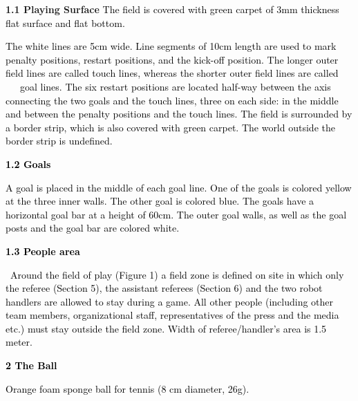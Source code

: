 \documentclass[a4paper]{article}
\begin{document}
\bigskip


\bigskip


\bigskip
\newpage

\textbf{1.1 Playing Surface}
\textcolor{black}{The field is covered with green carpet of 3mm thickness flat surface and flat bottom. }

\textcolor{black}{The white lines are 5cm wide. Line segments of 10cm length are used to mark penalty positions, restart
positions, and the kick-off position. The longer outer field lines are called touch lines, whereas the shorter outer
field lines are called}\textcolor{black}{ }\textcolor{red}{\ \ \ }\textcolor{black}{goal lines. The six restart
positions are located half-way between the axis connecting the two goals and the touch lines, three on each side: in
the middle and between the penalty positions and the touch lines. The field is surrounded by a border strip, which is
also covered with green carpet. The world outside the border strip is undefined.}

\textbf{\textcolor{black}{1.2 Goals}}

\textcolor{black}{A goal is placed in the middle of each goal line. One of the goals is colored yellow at the three
inner walls. The other goal is colored blue. The goals have a horizontal goal bar at a height of 60cm. The outer goal
walls, as well as the goal posts and the goal bar are colored white.}

\textbf{\textcolor{black}{1.3 People area}}

\textcolor{black}{\ Around the field of play (Figure 1) a field zone is defined on site in which only the referee
(Section 5), the assistant referees (Section 6) and the two robot handlers are allowed to stay during a game. All other
people (including other team members, organizational staff, representatives of the press and the media etc.) must stay
outside the field zone. Width of referee/handler\textgreek{’}s area is 1.5 meter.}

\textbf{\textcolor{black}{2 The Ball}}

\textcolor{black}{Orange foam sponge ball for tennis (8 cm diameter, 26g).}
\end{document}
